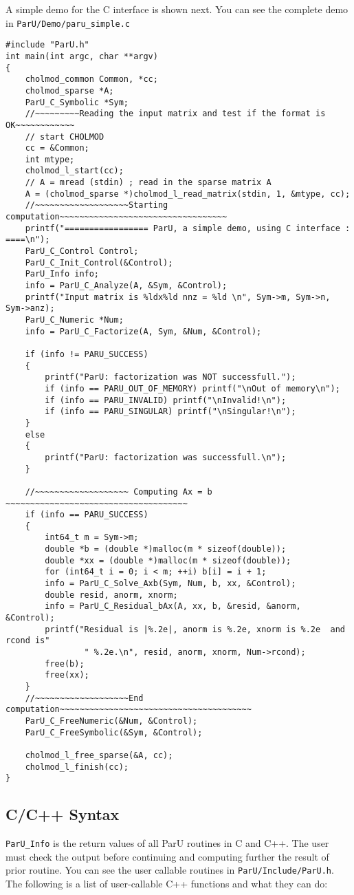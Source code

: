 \documentclass[12pt]{article}
\begin{document}
A simple demo for the C interface is shown next. You can see the complete demo
in \verb'ParU/Demo/paru_simple.c'
\begin{verbatim}
#include "ParU.h"
int main(int argc, char **argv)
{
    cholmod_common Common, *cc;
    cholmod_sparse *A;
    ParU_C_Symbolic *Sym;
    //~~~~~~~~~Reading the input matrix and test if the format is OK~~~~~~~~~~~~
    // start CHOLMOD
    cc = &Common;
    int mtype;
    cholmod_l_start(cc);
    // A = mread (stdin) ; read in the sparse matrix A
    A = (cholmod_sparse *)cholmod_l_read_matrix(stdin, 1, &mtype, cc);
    //~~~~~~~~~~~~~~~~~~~Starting computation~~~~~~~~~~~~~~~~~~~~~~~~~~~~~~~~~~
    printf("================= ParU, a simple demo, using C interface : ====\n");
    ParU_C_Control Control;
    ParU_C_Init_Control(&Control);
    ParU_Info info;
    info = ParU_C_Analyze(A, &Sym, &Control);
    printf("Input matrix is %ldx%ld nnz = %ld \n", Sym->m, Sym->n, Sym->anz);
    ParU_C_Numeric *Num;
    info = ParU_C_Factorize(A, Sym, &Num, &Control);

    if (info != PARU_SUCCESS)
    {
        printf("ParU: factorization was NOT successfull.");
        if (info == PARU_OUT_OF_MEMORY) printf("\nOut of memory\n");
        if (info == PARU_INVALID) printf("\nInvalid!\n");
        if (info == PARU_SINGULAR) printf("\nSingular!\n");
    }
    else
    {
        printf("ParU: factorization was successfull.\n");
    }

    //~~~~~~~~~~~~~~~~~~~ Computing Ax = b ~~~~~~~~~~~~~~~~~~~~~~~~~~~~~~~~~~~~~
    if (info == PARU_SUCCESS)
    {
        int64_t m = Sym->m;
        double *b = (double *)malloc(m * sizeof(double));
        double *xx = (double *)malloc(m * sizeof(double));
        for (int64_t i = 0; i < m; ++i) b[i] = i + 1;
        info = ParU_C_Solve_Axb(Sym, Num, b, xx, &Control);
        double resid, anorm, xnorm;
        info = ParU_C_Residual_bAx(A, xx, b, &resid, &anorm, &Control);
        printf("Residual is |%.2e|, anorm is %.2e, xnorm is %.2e  and rcond is"
                " %.2e.\n", resid, anorm, xnorm, Num->rcond);
        free(b);
        free(xx);
    }
    //~~~~~~~~~~~~~~~~~~~End computation~~~~~~~~~~~~~~~~~~~~~~~~~~~~~~~~~~~~~~~
    ParU_C_FreeNumeric(&Num, &Control);
    ParU_C_FreeSymbolic(&Sym, &Control);

    cholmod_l_free_sparse(&A, cc);
    cholmod_l_finish(cc);
}
\end{verbatim}

\subsection{C/C++ Syntax}
\verb'ParU_Info' is the return values of all ParU routines in C and C++.
The user must check the output before continuing and computing further the
result of prior routine. You can see the user callable routines in
\verb'ParU/Include/ParU.h'.  The following is a list of user-callable C++
functions and what they can do:
\end{document}
